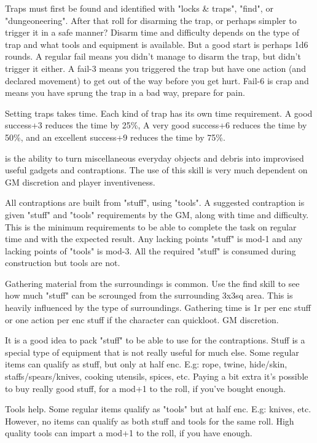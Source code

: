 Traps must first be found and identified with "locks \& traps", "find", or "dungeoneering". After that roll for disarming the trap, or perhaps simpler to trigger it in a safe manner? Disarm time and difficulty depends on the type of trap and what tools and equipment is available. But a good start is perhaps 1d6 rounds.
A regular fail means you didn't manage to disarm the trap, but didn't trigger it either. A fail-3 means you triggered the trap but have one action (and declared movement) to get out of the way before you get hurt. Fail-6 is crap and means you have sprung the trap in a bad way, prepare for pain.

Setting traps takes time. Each kind of trap has its own time requirement. A good success+3 reduces the time by 25\%, A very good success+6 reduces the time by 50\%, and an excellent success+9 reduces the time by 75\%.


 is the ability to turn miscellaneous everyday objects and debris into improvised useful gadgets and contraptions. The use of this skill is very much dependent on GM discretion and player inventiveness.

All contraptions are built from "stuff", using "tools". A suggested contraption is given "stuff" and "tools" requirements by the GM, along with time and difficulty. This is the minimum requirements to be able to complete the task on regular time and with the expected result. Any lacking points "stuff" is mod-1 and any lacking points of "tools" is mod-3.
All the required "stuff" is consumed during construction but tools are not.

Gathering material from the surroundings is common. Use the find skill to see how much "stuff" can be scrounged from the surrounding 3x3sq area. This is heavily influenced by the type of surroundings. Gathering time is 1r per enc stuff or one action per enc stuff if the character can quickloot. GM discretion.

It is a good idea to pack "stuff" to be able to use for the contraptions. Stuff is a special type of equipment that is not really useful for much else. Some regular items can qualify as stuff, but only at half enc. E.g: rope, twine, hide/skin, staffs/spears/knives, cooking utensils, spices, etc. Paying a bit extra it's possible to buy really good stuff, for a mod+1 to the roll, if you've bought enough.

Tools help. Some regular items qualify as "tools" but at half enc. E.g: knives, etc. However, no items can qualify as both stuff and tools for the same roll. High quality tools can impart a mod+1 to the roll, if you have enough.


